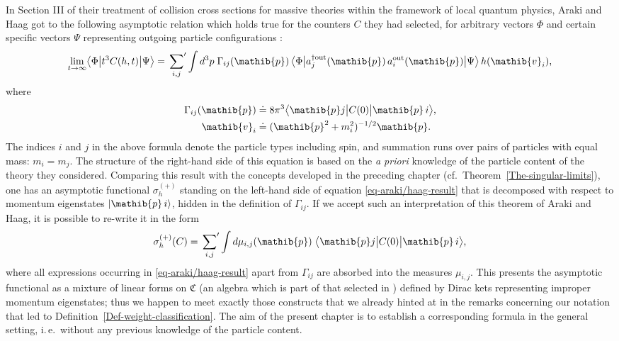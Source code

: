 \documentclass[11pt,twoside,openright]{report}
\theoremstyle{definition}
\theoremstyle{plain}
\theoremstyle{remark}
\theoremstyle{assumption}
\newcommand{\ket}[1]{\vert #1 \rangle}
\newcommand{\bscpx}[3]{\bigl\langle #1 \big\vert #2 \big\vert #3
  \bigr\rangle}
\newcommand{\Cfrak}{\mathfrak{C}}
\newcommand{\pib}{\mathib{p}}
\newcommand{\vib}{\mathib{v}}
\begin{document}
\noindent
In Section III of their treatment of collision cross sections for
massive theories within the framework of local quantum physics, Araki
and Haag got to the following asymptotic relation which holds true for
the counters $C$ they had selected, for arbitrary vectors $\Phi$ and
certain specific vectors $\Psi$ representing outgoing particle
configurations \cite[Theorem~4]{araki/haag:1967}:
\begin{equation}
  \label{eq-araki/haag-result}
  \lim_{t \rightarrow \infty} \bscpx{\Phi}{t^3 C ( h , t )}{\Psi} =
  \sideset{}{'} \sum_{i , j} \int d^3 p \; \Gamma_{i j} ( \pib ) \,
  \bscpx{\Phi}{a_j^{\dagger \text{out}} ( \pib ) \, a_i^{\text{out}} (
  \pib )}{\Psi} \, h ( \vib_i ) \text{,}
\end{equation}
where
\begin{align*}
  \Gamma_{i j} ( \pib ) & \doteq 8 \pi^3 \bscpx{\pib j}{C ( 0 )}{\pib
  \, i} \text{,} \\
  \vib_i & \doteq ( \pib^2 + m_i^2 )^{-1/2} \pib \text{.}
\end{align*}
The indices $i$ and $j$ in the above formula denote the particle types
including spin, and summation runs over pairs of particles with equal
mass: $m_i = m_j$. The structure of the right-hand side of this
equation is based on the \emph{a priori} knowledge of the particle
content of the theory they considered. Comparing this result with the
concepts developed in the preceding chapter
(cf.~Theorem~\ref{The-singular-limits}), one has an asymptotic
functional $\sigma_h^{( + )}$ standing on the left-hand side of
equation \eqref{eq-araki/haag-result} that is decomposed with respect
to momentum eigenstates $\ket{\pib \, i}$, hidden in the definition of
$\Gamma_{i j}$. If we accept such an interpretation of this theorem of
Araki and Haag, it is possible to re-write it in the form
\begin{equation*}
  \sigma_h^{( + )} ( C ) = \sideset{}{'} \sum_{i , j} \int d \mu_{i ,
  j} ( \pib ) \; \bscpx{\pib j}{C ( 0 )}{\pib \, i} \text{,}
\end{equation*}
where all expressions occurring in \eqref{eq-araki/haag-result} apart 
from $\Gamma_{i j}$ are absorbed into the measures $\mu_{i , j}$. This
presents the asymptotic functional as a mixture of linear forms on
$\Cfrak$ (an algebra which is part of that selected in
\cite{araki/haag:1967}) defined by Dirac kets representing improper
momentum eigenstates; thus we happen to meet exactly those constructs
that we already hinted at in the remarks concerning our notation
that led to Definition~\ref{Def-weight-classification}. The aim of the
present chapter is to establish a corresponding formula in the general
setting, i.\,e.~without any previous knowledge of the particle
content.
\end{document}
